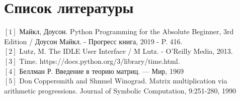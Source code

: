 %
\chapter{Список литературы}
\noindent$[1]$ Майкл, Доусон. Python Programming for the Absolute Beginner, 3rd Edition / Доусон Майкл. - Прогресс книга, 2019 - P. 416.\\
$[2]$ Lutz, M. The IDLE User Interface / M Lutz. - O’Reilly Media, 2013.\\
$[3]$ Time. https://docs.python.org/3/library/time.html.\\
$[4]$ Беллман Р. Введение в теорию матриц. —  Мир, 1969\\
$[5]$ Don Coppersmith and Shmuel Winograd. Matrix multiplication via arithmetic progressions. Journal of Symbolic Computation, 9:251-280, 1990\\